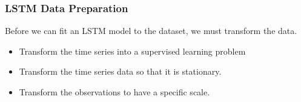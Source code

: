 
\begin{frame}[fragile] \frametitle{LSTM Data Preparation}
Before we can fit an LSTM model to the dataset, we must transform the data.
\begin{itemize}
\item Transform the time series into a supervised learning problem
\item Transform the time series data so that it is stationary.
\item Transform the observations to have a specific scale.
\end{itemize}
\end{frame}

